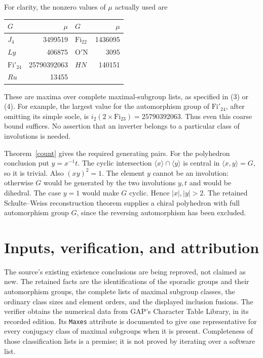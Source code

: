 \documentclass[11pt,a4paper]{article}
\begin{document}
For clarity, the nonzero values of $\mu$ actually used are
\begin{center}
\begin{tabular}{lrlr}\toprule
$G$&$\mu$&$G$&$\mu$\\\midrule
$J_4$&3499519&$\mathrm{Fi}_{22}$&1436095\\
$Ly$&406875&$\mathrm{O'N}$&3095\\
$\mathrm{Fi}'_{24}$&25790392063&$HN$&140151\\
$Ru$&13455&&\\\bottomrule
\end{tabular}
\end{center}
These are maxima over complete maximal-subgroup lists, as specified
in (3) or (4). For example, the largest value for the automorphism
group of $\mathrm{Fi}'_{24}$, after omitting its simple socle, is
$i_2(2\times\mathrm{Fi}_{23})=25790392063$. Thus even this coarse
bound suffices. No assertion that an inverter belongs to a particular
class of involutions is needed.

Theorem~\ref{count} gives the required generating pairs. For the
polyhedron conclusion put $y=x^{-1}t$. The cyclic intersection
$\langle x\rangle\cap\langle y\rangle$ is central in
$\langle x,y\rangle=G$, so it is trivial. Also $(xy)^2=1$.
The element $y$ cannot be an involution: otherwise $G$ would be
generated by the two involutions $y,t$ and would be dihedral.
The case $y=1$ would make $G$ cyclic. Hence $|x|,|y|>2$.
The retained Schulte--Weiss reconstruction theorem supplies a chiral
polyhedron with full automorphism group $G$, since the reversing
automorphism has been excluded.

\section{Inputs, verification, and attribution}
The source's existing existence conclusions are being reproved, not
claimed as new. The retained facts are the identifications of the
sporadic groups and their automorphism groups, the complete lists
of maximal subgroup classes, the ordinary class sizes and element
orders, and the displayed inclusion fusions. The verifier obtains
the numerical data from GAP's Character Table Library, in its
recorded edition. Its \texttt{Maxes} attribute is documented to give
one representative for every conjugacy class of maximal subgroups
when it is present. Completeness of those classification lists is
a premise; it is not proved by iterating over a software list.
\end{document}

